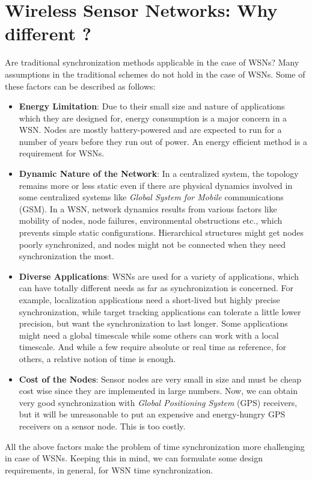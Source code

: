 \documentclass[a4paper,10pt]{report}
\begin{document}
\section{\textbf{Wireless Sensor Networks: Why different ?}}
\noindent Are traditional synchronization methods applicable in the case of WSNs? Many assumptions in the traditional schemes do not
hold in the case of WSNs. Some of these factors can be described as follows:
\begin{itemize}
\item \textbf{Energy Limitation}: Due to their small size and nature of applications which they are designed for, energy consumption is a major concern in a WSN. Nodes are mostly battery-powered and are expected to run for a number of years before they run out of power. An energy efficient method is a requirement for WSNs.
\item \textbf{Dynamic Nature of the Network}: In a centralized system, the topology remains more or less static even if there are physical
dynamics involved  in some centralized systems like \textit{Global System for Mobile} communications (GSM). In a WSN, network dynamics
results from various factors like mobility of nodes, node failures, environmental obstructions etc., which prevents simple static
configurations. Hierarchical structures might get nodes poorly synchronized, and nodes might not be connected when they need
synchronization the most.
\item \textbf{Diverse Applications}: WSNs are used for a variety of applications, which can have totally different needs as far as synchronization is concerned. For example, localization applications need a short-lived but highly
precise synchronization, while target tracking applications can tolerate a little lower precision, but want the synchronization to
last longer. Some applications might need a global timescale while some others can work with a local timescale. And while a few require
absolute or real time as reference, for others, a relative notion of time is enough.
\item \textbf{Cost of the Nodes}: Sensor nodes are very small in size and must be cheap cost wise since they are implemented in large
numbers. Now, we can obtain very good synchronization with \emph{Global Positioning System} (GPS) receivers, but it will be unreasonable to put an expensive and energy-hungry GPS receivers on a sensor node. This is too costly.
\end{itemize}
All the above factors make the problem of time synchronization more challenging in case of WSNs. Keeping this in mind, we can formulate
some design requirements, in general, for WSN time synchronization.
\end{document}
